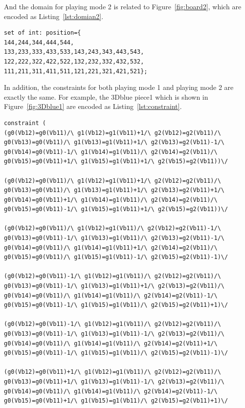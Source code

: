 And the domain for playing mode 2 is related to Figure~\ref{fig:board2}, which are encoded as Listing~\ref{lst:domian2}.
\begin{lstlisting}[language=minizinc,numbers=none,caption={Encoding for the domain of playing mode 2},label={lst:domian2}]
set of int: position={
144,244,344,444,544,
133,233,333,433,533,143,243,343,443,543,
122,222,322,422,522,132,232,332,432,532,
111,211,311,411,511,121,221,321,421,521};
\end{lstlisting}
\bigskip
\smallbreak
In addition, the constraints for both playing mode 1 and playing mode 2 are exactly the same. For example, the 3Dblue piece1 which is shown in Figure~\ref{fig:3Dblue1} are encoded as Listing~\ref{lst:constraint}.
\begin{lstlisting}[language=minizinc,numbers=none,caption={Encoding for 3Dblue piece1},label={lst:constraint}]
constraint ( 
(g0(Vb12)=g0(Vb11)/\ g1(Vb12)=g1(Vb11)+1/\ g2(Vb12)=g2(Vb11)/\ g0(Vb13)=g0(Vb11)/\ g1(Vb13)=g1(Vb11)+1/\ g2(Vb13)=g2(Vb11)-1/\ g0(Vb14)=g0(Vb11)-1/\ g1(Vb14)=g1(Vb11)/\ g2(Vb14)=g2(Vb11)/\ g0(Vb15)=g0(Vb11)+1/\ g1(Vb15)=g1(Vb11)+1/\ g2(Vb15)=g2(Vb11))\/ 

(g0(Vb12)=g0(Vb11)/\ g1(Vb12)=g1(Vb11)+1/\ g2(Vb12)=g2(Vb11)/\ g0(Vb13)=g0(Vb11)/\ g1(Vb13)=g1(Vb11)+1/\ g2(Vb13)=g2(Vb11)+1/\ g0(Vb14)=g0(Vb11)+1/\ g1(Vb14)=g1(Vb11)/\ g2(Vb14)=g2(Vb11)/\ g0(Vb15)=g0(Vb11)-1/\ g1(Vb15)=g1(Vb11)+1/\ g2(Vb15)=g2(Vb11))\/ 

(g0(Vb12)=g0(Vb11)/\ g1(Vb12)=g1(Vb11)/\ g2(Vb12)=g2(Vb11)-1/\ g0(Vb13)=g0(Vb11)-1/\ g1(Vb13)=g1(Vb11)/\ g2(Vb13)=g2(Vb11)-1/\ g0(Vb14)=g0(Vb11)/\ g1(Vb14)=g1(Vb11)+1/\ g2(Vb14)=g2(Vb11)/\ g0(Vb15)=g0(Vb11)/\ g1(Vb15)=g1(Vb11)-1/\ g2(Vb15)=g2(Vb11)-1)\/ 

(g0(Vb12)=g0(Vb11)-1/\ g1(Vb12)=g1(Vb11)/\ g2(Vb12)=g2(Vb11)/\ g0(Vb13)=g0(Vb11)-1/\ g1(Vb13)=g1(Vb11)+1/\ g2(Vb13)=g2(Vb11)/\ g0(Vb14)=g0(Vb11)/\ g1(Vb14)=g1(Vb11)/\ g2(Vb14)=g2(Vb11)-1/\ g0(Vb15)=g0(Vb11)-1/\ g1(Vb15)=g1(Vb11)/\ g2(Vb15)=g2(Vb11)+1)\/ 

(g0(Vb12)=g0(Vb11)-1/\ g1(Vb12)=g1(Vb11)/\ g2(Vb12)=g2(Vb11)/\ g0(Vb13)=g0(Vb11)-1/\ g1(Vb13)=g1(Vb11)-1/\ g2(Vb13)=g2(Vb11)/\ g0(Vb14)=g0(Vb11)/\ g1(Vb14)=g1(Vb11)/\ g2(Vb14)=g2(Vb11)+1/\ g0(Vb15)=g0(Vb11)-1/\ g1(Vb15)=g1(Vb11)/\ g2(Vb15)=g2(Vb11)-1)\/ 

(g0(Vb12)=g0(Vb11)+1/\ g1(Vb12)=g1(Vb11)/\ g2(Vb12)=g2(Vb11)/\ g0(Vb13)=g0(Vb11)+1/\ g1(Vb13)=g1(Vb11)-1/\ g2(Vb13)=g2(Vb11)/\ g0(Vb14)=g0(Vb11)/\ g1(Vb14)=g1(Vb11)/\ g2(Vb14)=g2(Vb11)-1/\ g0(Vb15)=g0(Vb11)+1/\ g1(Vb15)=g1(Vb11)/\ g2(Vb15)=g2(Vb11)+1)\/ 


\end{lstlisting}
